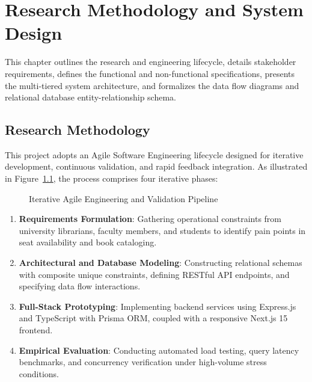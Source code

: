 \chapter{Research Methodology and System Design}

This chapter outlines the research and engineering lifecycle, details stakeholder requirements, defines the functional and non-functional specifications, presents the multi-tiered system architecture, and formalizes the data flow diagrams and relational database entity-relationship schema.

\section{Research Methodology}
This project adopts an Agile Software Engineering lifecycle designed for iterative development, continuous validation, and rapid feedback integration. As illustrated in Figure~\ref{fig:methodology_pipeline}, the process comprises four iterative phases:

\begin{figure}[H]
\centering
{}
\caption{Iterative Agile Engineering and Validation Pipeline}
\label{fig:methodology_pipeline}
\end{figure}

\begin{enumerate}
    \item \textbf{Requirements Formulation}: Gathering operational constraints from university librarians, faculty members, and students to identify pain points in seat availability and book cataloging.
    \item \textbf{Architectural and Database Modeling}: Constructing relational schemas with composite unique constraints, defining RESTful API endpoints, and specifying data flow interactions.
    \item \textbf{Full-Stack Prototyping}: Implementing backend services using Express.js and TypeScript with Prisma ORM, coupled with a responsive Next.js 15 frontend.
    \item \textbf{Empirical Evaluation}: Conducting automated load testing, query latency benchmarks, and concurrency verification under high-volume stress conditions.
\end{enumerate}


